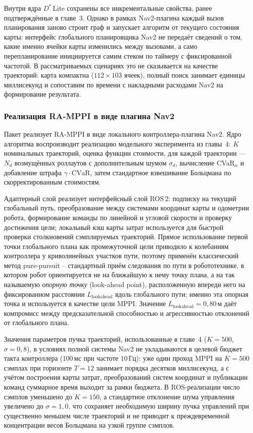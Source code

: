 \documentclass[a4paper,12pt]{extarticle}
\begin{document}
    Внутри ядра $D^*$\,Lite сохранены все инкрементальные свойства, ранее подтверждённые в главе~3. Однако в рамках Nav2-плагина каждый вызов планирования заново строит граф и запускает алгоритм от текущего состояния карты: интерфейс глобального планировщика Nav2 не передаёт сведений о том, какие именно ячейки карты изменились между вызовами, а само перепланирование инициируется самим стеком по таймеру с фиксированной частотой. В рассматриваемых сценариях это не сказывается на качестве траекторий: карта компактна ($112 \times 103$ ячеек), полный поиск занимает единицы миллисекунд и сопоставим по времени с накладными расходами Nav2 на формирование результата.

    \subsubsection{Реализация RA-MPPI в виде плагина Nav2}

    Пакет реализует RA-MPPI в виде локального контроллера-плагина Nav2. Ядро алгоритма воспроизводит реализацию модельного эксперимента из главы~4: $K$ номинальных траекторий, оценка функции стоимости, для каждой траектории --- $N_d$ возмущённых роллаутов с дополнительным шумом $\sigma_d$, вычисление CVaR$_\alpha$ и добавление штрафа $\gamma \cdot \text{CVaR}$, затем стандартное взвешивание Больцмана по скорректированным стоимостям.

    Адаптерный слой реализует интерфейсный слой ROS\,2: подписку на текущий глобальный путь, преобразование между системами координат карты и одометрии робота, формирование команды по линейной и угловой скорости и проверку достижения цели; локальный кэш карты затрат используется для быстрой проверки столкновений сэмплируемых траекторий. Прямое использование первой точки глобального плана как промежуточной цели приводило к колебаниям контроллера у криволинейных участков пути, поэтому применён классический метод pure-pursuit -- стандартный приём следования по пути в робототехнике, в котором робот ориентируется не на ближайшую к нему точку плана, а на так называемую \emph{опорную точку} (look-ahead point), расположенную впереди него на фиксированном расстоянии $L_{\text{lookahead}}$ вдоль глобального пути; именно эта опорная точка и используется в качестве цели MPPI. Значение $L_{\text{lookahead}} = 0{,}80$\,м даёт компромисс между предсказательной способностью и агрессивностью отклонений от глобального плана.

    Значения параметров пучка траекторий, использованные в главе~4 ($K = 500$, $\sigma = 0{,}8$), в условиях полной системы Nav2 не укладываются в целевой бюджет такта контроллера (100\,мс при частоте $10$\,Гц): уже один проход MPPI на $K = 500$ сэмплах при горизонте $T = 12$ занимает порядка десятков миллисекунд, а с учётом построения карты затрат, преобразований систем координат и публикации команд суммарное время выходит за рамки бюджета. В ROS-реализации число сэмплов уменьшено до $K = 150$, а стандартное отклонение шума управления увеличено до $\sigma = 1{,}0$, что сохраняет необходимую ширину пучка управлений при существенно меньшем числе траекторий и не приводит к преждевременной концентрации весов Больцмана на узкой группе сэмплов.
\end{document}
